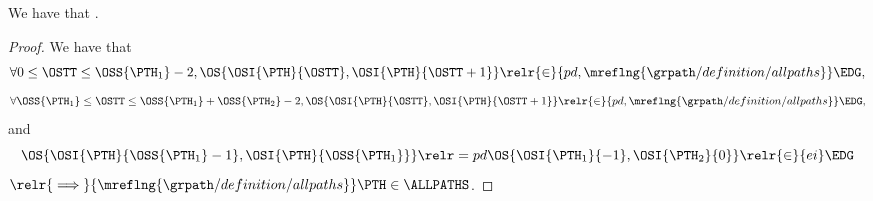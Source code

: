 \begin{proposition}
  We have that \subpathcompprop.%
\end{proposition}

\begin{proof}
  We have that 
  $$\forall 0 \le \OSTT \le \OSS{\PTH_1} - 2, \OS{\OSI{\PTH}{\OSTT}, \OSI{\PTH}{\OSTT+1}}
  \relr {\in} {pd,\mreflng{\grpath/definition/allpaths}} \EDG,$$
  $$\forall \OSS{\PTH_1} \le \OSTT \le \OSS{\PTH_1} + \OSS{\PTH_2} - 2, \OS{\OSI{\PTH}{\OSTT}, \OSI{\PTH}{\OSTT+1}}
  \relr {\in} {pd,\mreflng{\grpath/definition/allpaths}} \EDG,$$
  and
  $$\OS{\OSI{\PTH}{\OSS{\PTH_1} - 1}, \OSI{\PTH}{\OSS{\PTH_1}}} \relr = pd \OS{\OSI{\PTH_1}{-1}, \OSI{\PTH_2}{0}} \relr {\in} {ei} \EDG$$
  $\relr {\implies} {\mreflng{\grpath/definition/allpaths}} \PTH \in \ALLPATHS$.
\end{proof}
